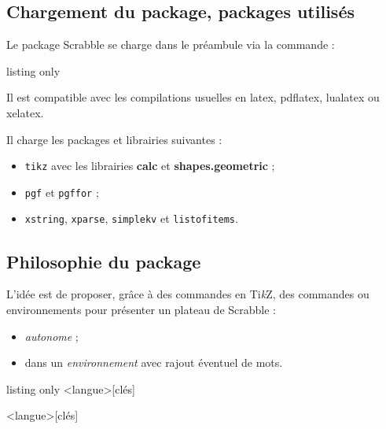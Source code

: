 \documentclass{article}
\providecommand\tikzlogo{Ti\textit{k}Z}
\let\TikZ\tikzlogo
\newcommand\Cle[1]{{\bfseries\sffamily\textlangle #1\textrangle}}
\begin{document}
\subsection{Chargement du package, packages utilisés}

Le package \textsf{Scrabble} se charge dans le préambule via la commande :

\begin{PresentationCode}{listing only}
\usepackage{Scrabble}
\end{PresentationCode}

Il est compatible avec les compilations usuelles en \textsf{latex}, \textsf{pdflatex}, \textsf{lualatex} ou \textsf{xelatex}.

\medskip

Il charge les packages et librairies suivantes :

\begin{itemize}
	\item \texttt{tikz} avec les librairies \Cle{calc} et \Cle{shapes.geometric} ;
	\item \texttt{pgf} et \texttt{pgffor} ;
	\item \texttt{xstring}, \texttt{xparse}, \texttt{simplekv} et \texttt{listofitems}.
\end{itemize}

\subsection{\og Philosophie \fg{} du package}

L'idée est de proposer, grâce à des commandes en \TikZ, des \textsf{commandes} ou \textsf{environnements} pour présenter un plateau de Scrabble\texttrademark{} :

\begin{itemize}
	\item \textit{autonome} ;
	\item dans un \textit{environnement} avec rajout éventuel de mots.
\end{itemize}

\begin{PresentationCode}{listing only}
\PlateauScrabble<langue>[clés]

\begin{EnvScrabbleFR}<langue>[clés]
\end{EnvScrabbleFR}
\end{PresentationCode}
\end{document}
